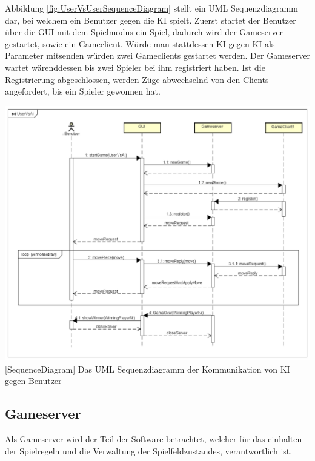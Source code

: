 \documentclass[12pt,a4paper,bibliography=totocnumbered,listof=totocnumbered]{article}
\begin{document}
Abbildung \ref{fig:UserVsUserSequenceDiagram} stellt ein UML Sequenzdiagramm dar, bei welchem ein Benutzer gegen die KI spielt.
Zuerst startet der Benutzer über die GUI mit dem Spielmodus ein Spiel, dadurch wird der Gameserver gestartet, sowie ein
Gameclient. Würde man stattdessen KI gegen KI als Parameter mitsenden würden zwei Gameclients gestartet werden. 
Der Gameserver wartet wärenddessen bis zwei Spieler bei ihm registriert haben. Ist die Registrierung abgeschlossen, werden Züge
abwechselnd von den Clients angefordert, bis ein Spieler gewonnen hat.

\vspace{1em}
\begin{minipage}{\linewidth}
	\centering
	\includegraphics[width=0.83\linewidth]{pics/UserVsAiCommunication.png}
	[SequenceDiagram]{ Das UML Sequenzdiagramm der Kommunikation von KI gegen Benutzer}
	\label{fig:UserVsUserSequenceDiagram}
\end{minipage}

\subsection{Gameserver}
Als Gameserver wird der Teil der Software betrachtet, welcher für das einhalten der Spielregeln und die Verwaltung der Spielfeldzustandes, 
verantwortlich ist. 
\end{document}
